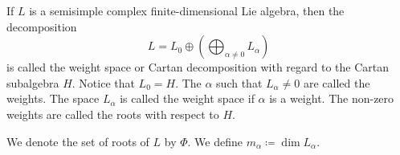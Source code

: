 If $L$ is a semisimple complex finite-dimensional Lie algebra, then the decomposition
\[ L = L_0 \oplus \left(\bigoplus_{\alpha\neq 0} L_{\alpha}\right) \]
is called the weight space or Cartan decomposition with regard to the Cartan
subalgebra $H$. Notice that $L_0 = H$. The $\alpha$ such that $L_\alpha\neq 0$ are
called the weights. The space $L_\alpha$ is called the weight space if $\alpha$ is
a weight. The non-zero weights are called the roots with respect to $H$.

We denote the set of roots of $L$ by $\Phi$. We define $m_\alpha\coloneqq \dim L_\alpha$.
